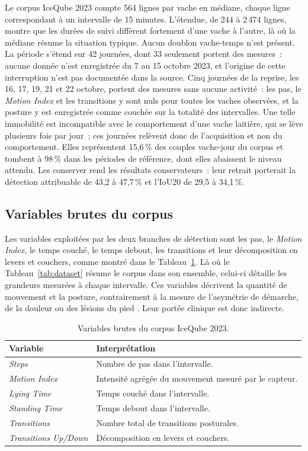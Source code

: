 Le corpus IceQube 2023 compte 564 lignes par vache en médiane, chaque ligne correspondant à
un intervalle de 15 minutes. L'étendue, de 244 à 2\,474 lignes, montre que les durées de
suivi diffèrent fortement d'une vache à l'autre, là où la médiane résume la situation
typique. Aucun doublon vache-temps n'est présent. La période s'étend sur 42 journées, dont 33
seulement portent des mesures~: aucune donnée n'est enregistrée du 7 au 15 octobre 2023, et
l'origine de cette interruption n'est pas documentée dans la source. Cinq journées de la
reprise, les 16, 17, 19, 21 et 22 octobre, portent des mesures sans aucune activité~: les pas,
le \textit{Motion Index} et les transitions y sont nuls pour toutes les vaches observées, et la
posture y est enregistrée comme couchée sur la totalité des intervalles. Une telle immobilité
est incompatible avec le comportement d'une vache laitière, qui se lève plusieurs fois par
jour~; ces journées relèvent donc de l'acquisition et non du comportement. Elles représentent
15,6\,\% des couples vache-jour du corpus et tombent à 98\,\% dans les périodes de référence,
dont elles abaissent le niveau attendu. Les conserver rend les résultats conservateurs~: leur
retrait porterait la détection attribuable de 43,2 à 47,7\,\% et l'IoU20 de 29,5 à 34,1\,\%.

\subsection{Variables brutes du corpus}
Les variables exploitées par les deux branches de détection sont les pas, le
\textit{Motion Index}, le temps couché, le temps debout, les transitions et leur
décomposition en levers et couchers, comme montré dans le
Tableau~\ref{tab:variables_brutes}. Là où le Tableau~\ref{tab:dataset} résume le corpus dans
son ensemble, celui-ci détaille les grandeurs mesurées à chaque intervalle. Ces variables
décrivent la quantité de mouvement et la
posture, contrairement à la mesure de l'asymétrie de démarche, de la douleur ou des lésions
du pied \citep{alsaaod2019automatic,oleary2020accelerometers}. Leur portée clinique est donc
indirecte.

\begin{table}[H]
  \centering
  \caption{Variables brutes du corpus IceQube 2023.}
  \label{tab:variables_brutes}
  \small
  \begin{tabular}{p{}p{}}
    \toprule
    Variable & Interprétation \\
    \midrule
    \textit{Steps} & Nombre de pas dans l'intervalle. \\
    \textit{Motion Index} & Intensité agrégée du mouvement mesuré par le capteur. \\
    \textit{Lying Time} & Temps couché dans l'intervalle. \\
    \textit{Standing Time} & Temps debout dans l'intervalle. \\
    \textit{Transitions} & Nombre total de transitions posturales. \\
    \textit{Transitions Up/Down} & Décomposition en levers et couchers. \\
    \bottomrule
  \end{tabular}
\end{table}

